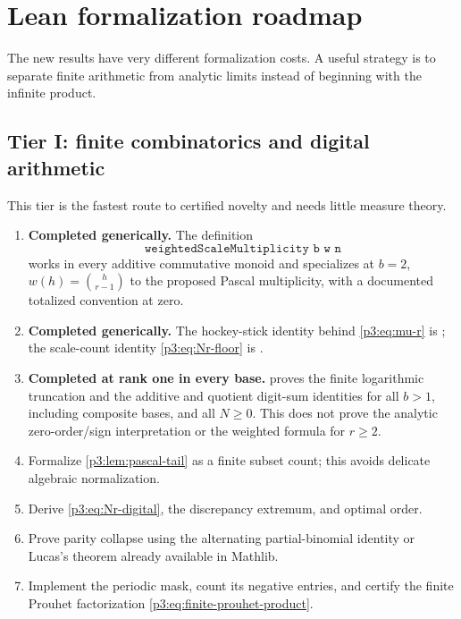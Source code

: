 \documentclass[11pt,oneside]{article}
\theoremstyle{definition}
\theoremstyle{remark}
\begin{document}
\section{Lean formalization roadmap}\label{p3:sec:lean}

The new results have very different formalization costs.  A useful strategy is to separate finite arithmetic from analytic limits instead of beginning with the infinite product.

\subsection{Tier I: finite combinatorics and digital arithmetic}

This tier is the fastest route to certified novelty and needs little measure theory.

\begin{enumerate}[label=\textbf{I.\arabic*}]
\item \textbf{Completed generically.}  The definition
\[
 \texttt{weightedScaleMultiplicity b w n}
\]
works in every additive commutative monoid and specializes at
$b=2$, $w(h)=\binom h{r-1}$ to the proposed Pascal multiplicity, with a
documented totalized convention at zero.
\item \textbf{Completed generically.}  The hockey-stick identity behind
\eqref{p3:eq:mu-r} is ; the scale-count
identity \eqref{p3:eq:Nr-floor} is .
\item \textbf{Completed at rank one in every base.}
 proves the finite logarithmic truncation and
the additive and quotient digit-sum identities for all \(b>1\), including
composite bases, and all \(N\ge0\).  This does not prove the analytic
zero-order/sign interpretation or the weighted formula for \(r\ge2\).
\item Formalize \cref{p3:lem:pascal-tail} as a finite subset count; this avoids delicate algebraic normalization.
\item Derive \eqref{p3:eq:Nr-digital}, the discrepancy extremum, and optimal order.
\item Prove parity collapse using the alternating partial-binomial identity or Lucas's theorem already available in Mathlib.
\item Implement the periodic mask, count its negative entries, and certify the finite Prouhet factorization \eqref{p3:eq:finite-prouhet-product}.
\end{enumerate}
\end{document}
